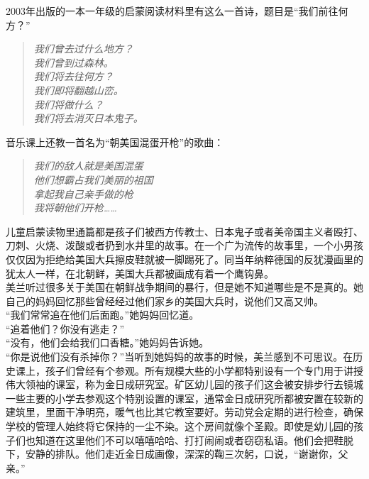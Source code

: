 2003年出版的一本一年级的启蒙阅读材料里有这么一首诗，题目是“我们前往何方？”\\

\begin{quote}
	\begin{spacing}{1.0}  %
		\textit{{\footnotesize 	我们曾去过什么地方？\\
		我们曾到过森林。\\
		我们将去往何方？\\
		我们即将翻越山峦。\\
		我们将做什么？\\
		我们将去消灭日本鬼子。\\}}
	\end{spacing}
\end{quote}

音乐课上还教一首名为“朝美国混蛋开枪”的歌曲：\\

\begin{quote}
	\begin{spacing}{1.0}  %
		\textit{{\footnotesize 	我们的敌人就是美国混蛋\\
		他们想霸占我们美丽的祖国\\
		拿起我自己亲手做的枪\\
		我将朝他们开枪……\\}}
	\end{spacing}
\end{quote}

儿童启蒙读物里通篇都是孩子们被西方传教士、日本鬼子或者美帝国主义者殴打、刀刺、火烧、泼酸或者扔到水井里的故事。在一个广为流传的故事里，一个小男孩仅仅因为拒绝给美国大兵擦皮鞋就被一脚踢死了。同当年纳粹德国的反犹漫画里的犹太人一样，在北朝鲜，美国大兵都被画成有着一个鹰钩鼻。\\

美兰听过很多关于美国在朝鲜战争期间的暴行，但是她不知道哪些是不是真的。她自己的妈妈回忆那些曾经经过他们家乡的美国大兵时，说他们又高又帅。\\

“我们常常追在他们后面跑。”她妈妈回忆道。\\

“追着他们？你没有逃走？”\\

“没有，他们会给我们口香糖。”她妈妈告诉她。\\

“你是说他们没有杀掉你？”当听到她妈妈的故事的时候，美兰感到不可思议。在历史课上，孩子们曾经有个参观。所有规模大些的小学都特别设有一个专门用于讲授伟大领袖的课室，称为金日成研究室。矿区幼儿园的孩子们这会被安排步行去镜城一些主要的小学去参观这个特别设置的课室，通常金日成研究所都被安置在较新的建筑里，里面干净明亮，暖气也比其它教室要好。劳动党会定期的进行检查，确保学校的管理人始终将它保持的一尘不染。这个房间就像个圣殿。即使是幼儿园的孩子们也知道在这里他们不可以嘻嘻哈哈、打打闹闹或者窃窃私语。他们会把鞋脱下，安静的排队。他们走近金日成画像，深深的鞠三次躬，口说，“谢谢你，父亲。”\\

